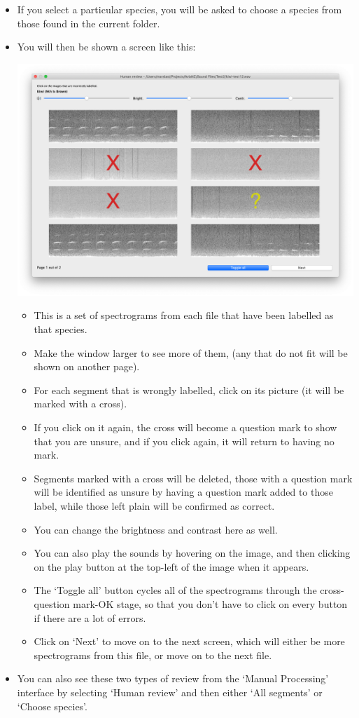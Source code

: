\documentclass{article}
\begin{document}
\begin{itemize}
\item If you select a particular species, you will be asked to choose a species from those found in the current folder.
\item You will then be shown a screen like this:
\begin{center}
	\includegraphics[width=.4\textwidth]{Figs/review2}
\end{center}

\begin{itemize}
\item This is a set of spectrograms from each file that have been labelled as that species. 
\item Make the window larger to see more of them, (any that do not fit will be shown on another page). 
\item For each segment that is wrongly labelled, click on its picture (it will be marked with a cross). 
\item If you click on it again, the cross will become a question mark to show that you are unsure, and if you click again, it will return to having no mark. 
\item Segments marked with a cross will be deleted, those with a question mark will be identified as unsure by having a question mark added to those label, while those left plain will be confirmed as correct.  
\item You can change the brightness and contrast here as well.
\item You can also play the sounds by hovering on the image, and then clicking on the play button at the top-left of the image when it appears. 
\item The `Toggle all' button cycles all of the spectrograms through the cross-question mark-OK stage, so that you don't have to click on every button if there are a lot of errors. 
\item Click on `Next' to move on to the next screen, which will either be more spectrograms from this file, or move on to the next file. 
\end{itemize}

\item You can also see these two types of review from the `Manual Processing' interface by selecting `Human review' and then either `All segments' or `Choose species'. 
\end{itemize}
\end{document}
